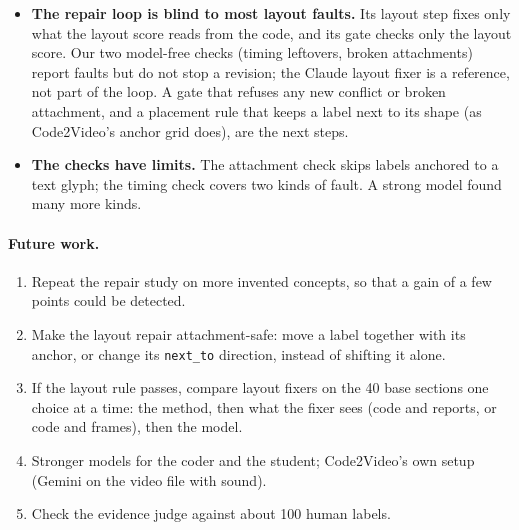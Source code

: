 \documentclass[11pt]{article}
\begin{document}
\begin{itemize}
  \item \textbf{The repair loop is blind to most layout faults.} Its layout step fixes only what the layout score
  reads from the code, and its gate checks only the layout score. Our two model-free checks (timing leftovers, broken attachments) report faults but do not stop a revision;
  the Claude layout fixer is a reference, not part of the loop. A gate that refuses any new conflict or broken
  attachment, and a placement rule that keeps a label next to its shape (as Code2Video's anchor grid does), are the
  next steps.
  \item \textbf{The checks have limits.} The attachment check skips labels anchored to a text glyph; the timing check
  covers two kinds of fault. A strong model found many more kinds.
\end{itemize}

\paragraph{Future work.}
\begin{enumerate}
  \item Repeat the repair study on more invented concepts, so that a gain of a few points could be detected.
  \item Make the layout repair attachment-safe: move a label together with its anchor, or change its
  \texttt{next\_to} direction, instead of shifting it alone.
  \item If the layout rule passes, compare layout fixers on the 40 base sections one choice at a time: the method,
  then what the fixer sees (code and reports, or code and frames), then the model.
  \item Stronger models for the coder and the student; Code2Video's own setup (Gemini on the video file with sound).
  \item Check the evidence judge against about 100 human labels.
\end{enumerate}

\end{document}
